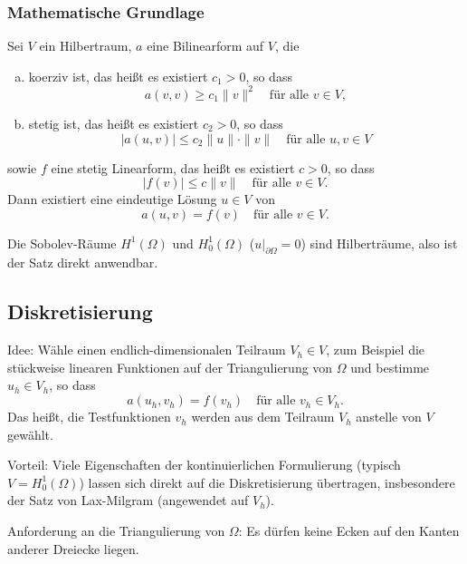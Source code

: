 \subsubsection*{Mathematische Grundlage}
\begin{thm}
  Sei $V$ ein Hilbertraum, $a$ eine Bilinearform auf $V$, die
  \begin{enumerate}[a)]
  \item koerziv ist, das heißt es existiert $c_1 > 0$, so dass
    \[ a(v,v) \ge c_1 \| v \|^2
      \quad \text{für alle } v \in V, \]
  \item stetig ist, das heißt es existiert $c_2 > 0$, so dass
    \[ |a(u,v)| \le c_2 \|u\| \cdot \| v \|
      \quad \text{für alle } u, v \in V \]
  \end{enumerate}
  sowie $f$ eine stetig Linearform, das heißt es existiert $c > 0$, so dass
  \[ |f(v)| \le c \|v\|
    \quad \text{für alle } v \in V. \]
  Dann existiert eine eindeutige Lösung $u \in V$ von
  \[ a(u,v) = f(v) \quad \text{für alle } v \in V. \]  
\end{thm}

\begin{rmrk*}
  Die Sobolev-Räume  $H^1(\Omega)$ und $H_0^1(\Omega)$ ($u|_{\partial \Omega} =
  0$) sind Hilberträume, also ist der Satz direkt anwendbar.
\end{rmrk*}

\subsection{Diskretisierung} %
Idee: Wähle einen endlich-dimensionalen Teilraum $V_h \in V$, zum Beispiel die
stückweise linearen Funktionen auf der Triangulierung von $\Omega$ und bestimme
$u_h \in V_h$, so dass
\[ a(u_h, v_h) = f(v_h) \quad \text{für alle } v_h \in V_h. \]
Das heißt, die Testfunktionen $v_h$ werden aus dem Teilraum $V_h$ anstelle von
$V$ gewählt.

Vorteil: Viele Eigenschaften der kontinuierlichen Formulierung (typisch $V =
H_0^1(\Omega)$) lassen sich direkt auf die Diskretisierung übertragen,
insbesondere der Satz von Lax-Milgram (angewendet auf $V_h$).

Anforderung an die Triangulierung von $\Omega$: Es dürfen keine Ecken auf den
Kanten anderer Dreiecke liegen.

